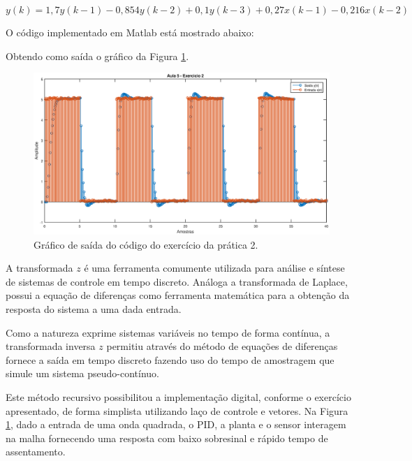 \begin{equation}
y(k) =  1,7y(k-1) - 0,854y(k-2) + 0,1y(k-3) + 0,27x(k-1) - 0,216x(k-2)
\label{pr_2_5}
\end{equation}

O código implementado em Matlab está mostrado abaixo:


Obtendo como saída o gráfico da Figura \ref{saida_ex2_pr_2}.

\begin{landscape}
  \begin{figure}[!ht]
      \centering
      \includegraphics[scale = .66]{Imagens/Aula_5_exercicio2.eps}
      \caption{Gráfico de saída do código do exercício da prática 2.}
      \label{saida_ex2_pr_2}
  \end{figure}
\end{landscape}

A transformada $z$ é uma ferramenta comumente utilizada para análise e síntese de sistemas de controle em tempo discreto. Análoga a transformada de Laplace, possui a equação de diferenças como ferramenta matemática para a obtenção da resposta do sistema a uma dada entrada. 

Como a natureza exprime sistemas variáveis no tempo de forma contínua, a transformada inversa $z$ permitiu através do método de equações de diferenças fornece a saída em tempo discreto fazendo uso do tempo de amostragem que simule um sistema pseudo-contínuo.

Este método recursivo possibilitou a implementação digital, conforme o exercício apresentado, de forma simplista utilizando laço de controle e vetores. Na Figura \ref{saida_ex2_pr_2}, dado a entrada de uma onda quadrada, o PID, a planta e o sensor interagem na malha fornecendo uma resposta com baixo sobresinal e rápido tempo de assentamento.